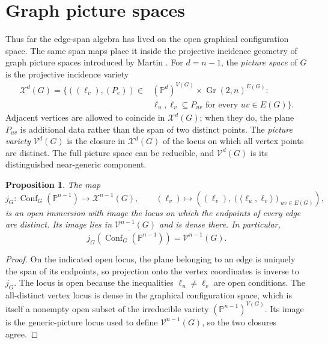 \documentclass[11pt]{amsart}
\theoremstyle{plain}
\newtheorem{proposition}[theorem]{Proposition}
\theoremstyle{definition}
\theoremstyle{remark}
\newcommand{\PP}{\mathbb{P}}
\newcommand{\Conf}{\operatorname{Conf}}
\newcommand{\Gr}{\operatorname{Gr}}
\begin{document}
\section{Graph picture spaces}\label{sec:picture-spaces}

Thus far the edge-span algebra has lived on the open graphical configuration
space.  The same span maps place it inside the projective incidence geometry
of graph picture spaces introduced by Martin
\cite{MartinGeometry,MartinTopology}.  For
$d=n-1$, the \emph{picture space} of $G$ is the projective incidence variety
\[
  \begin{aligned}
  \mathcal X^d(G)=\bigl\{((\ell_v),(P_e))\in{}&
    (\PP^d)^{V(G)}\times\Gr(2,n)^{E(G)}:\\
    &\ell_u,\ell_v\subseteq P_{uv}
      \text{ for every }uv\in E(G)\bigr\}.
  \end{aligned}
\]
Adjacent vertices are allowed to coincide in $\mathcal X^d(G)$; when they do,
the plane $P_{uv}$ is additional data rather than the span of two distinct
points.  The \emph{picture variety} $\mathcal V^d(G)$ is the closure in
$\mathcal X^d(G)$ of the locus on which all vertex points are distinct.  The
full picture space can be reducible, and $\mathcal V^d(G)$ is its distinguished
near-generic component.

\begin{proposition}\label{prop:picture-compactification}
The map
\[
  j_G:\Conf_G(\PP^{n-1})\longrightarrow\mathcal X^{n-1}(G),
  \qquad
  (\ell_v)\longmapsto
  ((\ell_v),(\langle\ell_u,\ell_v\rangle)_{uv\in E(G)}),
\]
is an open immersion with image the locus on which the endpoints of every
edge are distinct.  Its image lies in $\mathcal V^{n-1}(G)$ and is dense
there.  In particular,
\[
  \overline{j_G(\Conf_G(\PP^{n-1}))}=\mathcal V^{n-1}(G).
\]
\end{proposition}

\begin{proof}
On the indicated open locus, the plane belonging to an edge is uniquely the
span of its endpoints, so projection onto the vertex coordinates is inverse
to $j_G$.  The locus is open because the inequalities
$\ell_u\ne\ell_v$ are open conditions.  The all-distinct vertex locus is
dense in the graphical configuration space, which is itself a nonempty open
subset of the irreducible variety $(\PP^{n-1})^{V(G)}$.  Its image is the
generic-picture locus used to define $\mathcal V^{n-1}(G)$, so the two
closures agree.
\end{proof}
\end{document}
